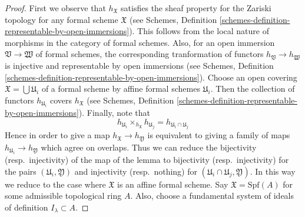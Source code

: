 \begin{proof}
First we observe that $h_\mathfrak X$ satisfies the sheaf property for
the Zariski topology for any formal scheme $\mathfrak X$ (see
Schemes, Definition \ref{schemes-definition-representable-by-open-immersions}).
This follows from the local nature of morphisms in the category
of formal schemes. Also, for an open immersion
$\mathfrak V \to \mathfrak W$ of formal schemes,
the corresponding tranformation of functors $h_\mathfrak V \to h_\mathfrak W$
is injective and representable by open immersions (see
Schemes, Definition \ref{schemes-definition-representable-by-open-immersions}).
Choose an open covering $\mathfrak X = \bigcup \mathfrak U_i$
of a formal scheme by affine formal schemes $\mathfrak U_i$.
Then the collection of functors
$h_{\mathfrak U_i}$ covers $h_\mathfrak X$ (see
Schemes, Definition \ref{schemes-definition-representable-by-open-immersions}).
Finally, note that
$$
h_{\mathfrak U_i} \times_{h_\mathfrak X} h_{\mathfrak U_j} =
h_{\mathfrak U_i \cap \mathfrak U_j}
$$
Hence in order to give a map $h_\mathfrak X \to h_\mathfrak Y$
is equivalent to giving a family of maps
$h_{\mathfrak U_i} \to h_\mathfrak Y$ which agree on overlaps.
Thus we can reduce the bijectivity (resp.\ injectivity) of the map
of the lemma to bijectivity (resp.\ injectivity) for the pairs
$(\mathfrak U_i, \mathfrak Y)$
and injectivity (resp.\ nothing)
for $(\mathfrak U_i \cap \mathfrak U_j, \mathfrak Y)$.
In this way we reduce to the case where $\mathfrak X$ is an
affine formal scheme. Say $\mathfrak X = \text{Spf}(A)$
for some admissible topological ring $A$. Also, choose a
fundamental system of ideals of definition $I_\lambda \subset A$.


\end{proof}
